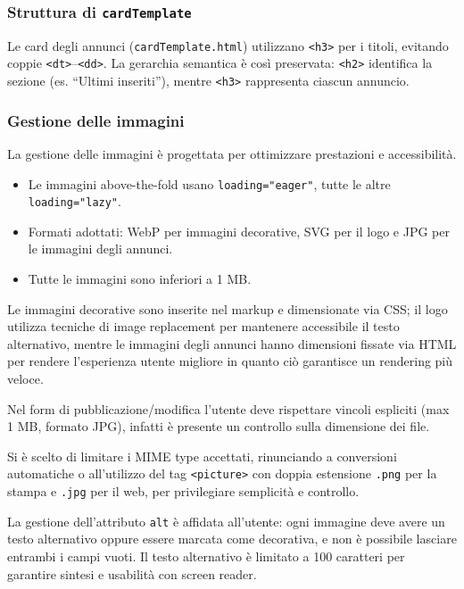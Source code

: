 \documentclass[a4paper,12pt]{article}
\begin{document}
\subsubsection{Struttura di \texttt{cardTemplate}}
Le card degli annunci (\texttt{cardTemplate.html}) utilizzano \texttt{<h3>} per i titoli, evitando coppie \texttt{<dt>}–\texttt{<dd>}.  
La gerarchia semantica è così preservata: \texttt{<h2>} identifica la sezione (es. “Ultimi inseriti”), mentre \texttt{<h3>} rappresenta ciascun annuncio. 

\subsubsection{Gestione delle immagini}
La gestione delle immagini è progettata per ottimizzare prestazioni e accessibilità.

\begin{itemize}
    \item Le immagini above-the-fold usano \texttt{loading="eager"}, tutte le altre \texttt{loading="lazy"}.
    \item Formati adottati: WebP per immagini decorative, SVG per il logo e JPG per le immagini degli annunci.
    \item Tutte le immagini sono inferiori a 1 MB.
\end{itemize}

Le immagini decorative sono inserite nel markup e dimensionate via CSS; il logo utilizza tecniche di image replacement per mantenere accessibile il testo alternativo, mentre le immagini degli annunci hanno dimensioni fissate via HTML per rendere 
l'esperienza utente migliore in quanto ciò garantisce un rendering più veloce.

Nel form di pubblicazione/modifica l’utente deve rispettare vincoli espliciti (max 1 MB, formato JPG), infatti è presente un controllo sulla dimensione dei file.

Si è scelto di limitare i MIME type accettati, rinunciando a conversioni automatiche o all'utilizzo del tag \texttt{<picture>} con doppia estensione \texttt{.png} per la stampa e \texttt{.jpg} per il web, per privilegiare semplicità e controllo.

La gestione dell’attributo \texttt{alt} è affidata all’utente: ogni immagine deve avere un testo alternativo oppure essere marcata come decorativa, e non è possibile lasciare entrambi i campi vuoti. Il testo alternativo è limitato a 100 caratteri per garantire sintesi e usabilità con screen reader.
\end{document}

